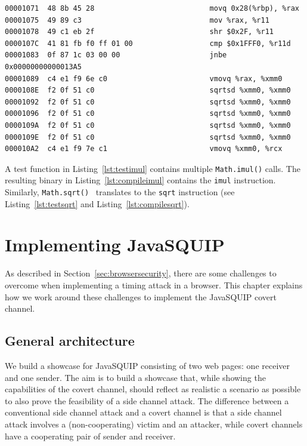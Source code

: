 \documentclass[11pt,
  titlepage=false,
  parskip=half,      %
]{scrreprt}
\begin{document}
\begin{lstlisting}[float,caption={The compiled result of the \texttt{sqrt} test function},label={lst:compilesqrt}]
00001071  48 8b 45 28                           movq 0x28(%rbp), %rax
00001075  49 89 c3                              mov %rax, %r11
00001078  49 c1 eb 2f                           shr $0x2F, %r11
0000107C  41 81 fb f0 ff 01 00                  cmp $0x1FFF0, %r11d
00001083  0f 87 1c 03 00 00                     jnbe 0x00000000000013A5
00001089  c4 e1 f9 6e c0                        vmovq %rax, %xmm0
0000108E  f2 0f 51 c0                           sqrtsd %xmm0, %xmm0
00001092  f2 0f 51 c0                           sqrtsd %xmm0, %xmm0
00001096  f2 0f 51 c0                           sqrtsd %xmm0, %xmm0
0000109A  f2 0f 51 c0                           sqrtsd %xmm0, %xmm0
0000109E  f2 0f 51 c0                           sqrtsd %xmm0, %xmm0
000010A2  c4 e1 f9 7e c1                        vmovq %xmm0, %rcx
\end{lstlisting}

A test function in Listing~\ref{lst:testimul} contains multiple \texttt{Math.imul()} calls.
The resulting binary in Listing~\ref{lst:compileimul} contains the \texttt{imul} instruction.
Similarly, \texttt{Math.sqrt()}~\cite{mathsqrt} translates to the \texttt{sqrt} instruction (see Listing~\ref{lst:testsqrt} and Listing~\ref{lst:compilesqrt}).

\chapter{Implementing JavaSQUIP}
\label{ch:implementation}
As described in Section~\ref{sec:browsersecurity}, there are some challenges to overcome when implementing a timing attack in a browser.
This chapter explains how we work around these challenges to implement the JavaSQUIP covert channel.

\section{General architecture}
\label{sec:general-architecture}
We build a showcase for JavaSQUIP consisting of two web pages: one receiver and one sender.
The aim is to build a showcase that, while showing the capabilities of the covert channel,
should reflect as realistic a scenario as possible to also prove the feasibility of a side channel attack.
The difference between a conventional side channel attack and a covert channel is that a side channel attack involves a (non-cooperating) victim and
an attacker, while covert channels have a cooperating pair of sender and receiver.
\end{document}
